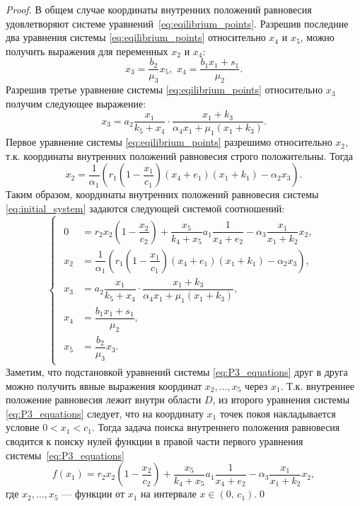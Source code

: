 \documentclass[14pt,a4paper]{extarticle}
\begin{document}
	\begin{proof}
		В общем случае координаты внутренних положений равновесия удовлетворяют системе уравнений~\ref{eq:eqilibrium_points}. Разрешив последние два уравнения системы \ref{eq:eqilibrium_points} относительно $x_4$ и $x_5$, можно получить выражения для переменных $x_2$ и $x_4$: 
		\[x_3=\dfrac{b_2}{\mu_3}x_5,\,\, x_4=\dfrac{b_1x_1+s_1}{\mu_2}.\]
		Разрешив третье уравнение системы \ref{eq:eqilibrium_points} относительно $x_3$ получим следующее выражение:
		\[x_3 = a_2\dfrac{x_1}{k_5+x_4}\cdot\dfrac{x_1+k_3}{\alpha_4x_1+\mu_1(x_1+k_3)}.\]
		Первое уравнение системы \ref{eq:eqilibrium_points} разрешимо относительно $x_2$, т.к. координаты внутренних положений равновесия строго положительны. Тогда
		\[x_2 = \dfrac{1}{\alpha_1}\left(r_1\left(1-\dfrac{x_1}{c_1}\right)(x_4+e_1)(x_1+k_1)-\alpha_2x_3\right).\]
		Таким образом, координаты внутренних положений равновесия системы \ref{eq:initial_system} задаются следующей системой соотношений:
		\begin{equation}\label{eq:P3_equations}
			\begin{cases}
				\begin{aligned}
					0 &= r_2x_2\left(1-\dfrac{x_2}{c_2}\right)+\dfrac{x_5}{k_4+x_5}a_1\dfrac{1}{x_4+e_2}-\alpha_3\dfrac{x_1}{x_1+k_2}x_2,\\
					x_2 &= \dfrac{1}{\alpha_1}\left(r_1\left(1-\dfrac{x_1}{c_1}\right)(x_4+e_1)(x_1+k_1)-\alpha_2x_3\right),\\
					x_3 &= a_2\dfrac{x_1}{k_5+x_4}\cdot\dfrac{x_1+k_3}{\alpha_4x_1+\mu_1(x_1+k_3)},\\
					x_4 &= \dfrac{b_1x_1+s_1}{\mu_2},\\
					x_5 &= \dfrac{b_2}{\mu_3}x_3.
				\end{aligned}
			\end{cases}
		\end{equation}
		Заметим, что подстановкой уравнений системы \ref{eq:P3_equations} друг в друга можно получить явные выражения координат $x_2,\ldots,x_5$ через $x_1$. Т.к. внутреннее положение равновесия лежит внутри области $D$, из второго уравнения системы \ref{eq:P3_equations} следует, что на координату $x_1$ точек покоя накладывается условие $0 < x_1 < c_1$. Тогда задача поиска внутреннего положения равновесия сводится к поиску нулей функции в правой части первого уравнения системы~\ref{eq:P3_equations}
		\[f(x_1)=r_2x_2\left(1-\dfrac{x_2}{c_2}\right)+\dfrac{x_5}{k_4+x_5}a_1\dfrac{1}{x_4+e_2}-\alpha_3\dfrac{x_1}{x_1+k_2}x_2,\]
		где $x_2,\ldots,x_5$ --- функции от $x_1$ на интервале $x\in\left(0,\, c_1\right)$.\qed
	\end{proof}
	
\end{document}
